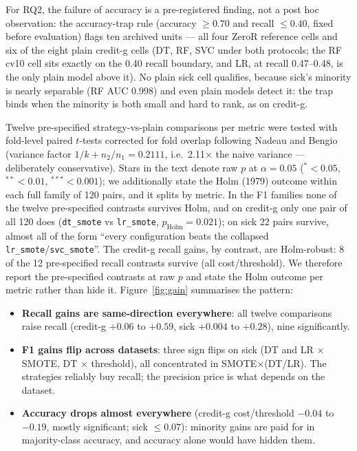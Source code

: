For RQ2, the failure of accuracy is a pre-registered finding, not a post hoc observation: the accuracy-trap rule (accuracy $\geq 0.70$ and recall $\leq 0.40$, fixed before evaluation) flags ten archived units --- all four ZeroR reference cells and six of the eight plain credit-g cells (DT, RF, SVC under both protocols; the RF cv10 cell sits exactly on the 0.40 recall boundary, and LR, at recall 0.47--0.48, is the only plain model above it). No plain sick cell qualifies, because sick's minority is nearly separable (RF AUC 0.998) and even plain models detect it: the trap binds when the minority is both small and hard to rank, as on credit-g.

Twelve pre-specified strategy-vs-plain comparisons per metric were tested with fold-level paired $t$-tests corrected for fold overlap following Nadeau and Bengio (variance factor $1/k + n_2/n_1 = 0.2111$, i.e.\ 2.11$\times$ the naive variance --- deliberately conservative). Stars in the text denote raw $p$ at $\alpha=0.05$ ($^{*}<0.05$, $^{**}<0.01$, $^{***}<0.001$); we additionally state the Holm (1979) outcome within each full family of 120 pairs, and it splits by metric. In the F1 families none of the twelve pre-specified contrasts survives Holm, and on credit-g only one pair of all 120 does (\texttt{dt\_smote} vs \texttt{lr\_smote}, $p_{\mathrm{Holm}}=0.021$); on sick 22 pairs survive, almost all of the form ``every configuration beats the collapsed \texttt{lr\_smote}/\texttt{svc\_smote}''. The credit-g recall gains, by contrast, are Holm-robust: 8 of the 12 pre-specified recall contrasts survive (all cost/threshold). We therefore report the pre-specified contrasts at raw $p$ and state the Holm outcome per metric rather than hide it. Figure~\ref{fig:gain} summarises the pattern:

\begin{itemize}
  \item \textbf{Recall gains are same-direction everywhere}: all twelve comparisons raise recall (credit-g $+0.06$ to $+0.59$, sick $+0.004$ to $+0.28$), nine significantly.
  \item \textbf{F1 gains flip across datasets}: three sign flips on sick (DT and LR $\times$ SMOTE, DT $\times$ threshold), all concentrated in SMOTE$\times$(DT/LR). The strategies reliably buy recall; the precision price is what depends on the dataset.
  \item \textbf{Accuracy drops almost everywhere} (credit-g cost/threshold $-0.04$ to $-0.19$, mostly significant; sick $\leq 0.07$): minority gains are paid for in majority-class accuracy, and accuracy alone would have hidden them.
\end{itemize}

